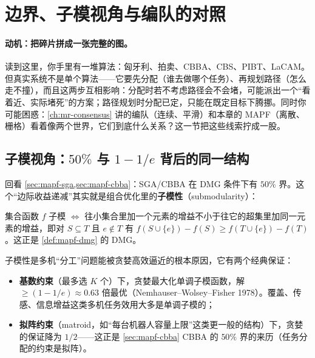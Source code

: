 \section{边界、子模视角与编队的对照}
\label{sec:mapf-submod}

\paragraph{动机：把碎片拼成一张完整的图。}
读到这里，你手里有一堆算法：匈牙利、拍卖、CBBA、CBS、PIBT、LaCAM。但真实系统不是单个算法——它要先分配（谁去做哪个任务）、再规划路径（怎么走不撞），而且这两步互相影响：分配时若不考虑路径会不会堵，可能派出一个“看着近、实际堵死”的方案；路径规划时分配已定，只能在既定目标下腾挪。同时你可能困惑：\cref{ch:mr-consensus} 讲的编队（连续、平滑）和本章的 MAPF（离散、栅格）看着像两个世界，它们到底什么关系？这一节把这些线索拧成一股。

\subsection{子模视角：\texorpdfstring{$50\%$}{50} 与 \texorpdfstring{$1-1/e$}{1-1/e} 背后的同一结构}
\label{sec:mapf-submod-theory}

回看 \cref{sec:mapf-sga,sec:mapf-cbba}：SGA/CBBA 在 DMG 条件下有 $50\%$ 界。这个“边际收益递减”其实就是组合优化里的\textbf{子模性}（submodularity）：

\begin{definition}[子模性]\label{def:mapf-submodular}
集合函数 $f$ 子模 $\iff$ 往小集合里加一个元素的增益不小于往它的超集里加同一元素的增益，即对 $S\subseteq T$ 且 $e\notin T$ 有 $f(S\cup\{e\})-f(S)\ge f(T\cup\{e\})-f(T)$。这正是 \cref{def:mapf-dmg} 的 DMG。
\end{definition}

子模性是多机“分工”问题能被贪婪高效逼近的根本原因，它有两个经典保证：

\begin{theorem}[子模贪婪的两个近似界]\label{thm:mapf-submod-bounds}
\begin{itemize}
  \item \textbf{基数约束}（最多选 $K$ 个）下，贪婪最大化单调子模函数，解 $\ge (1-1/e)\approx 0.63$ 倍最优（Nemhauser--Wolsey--Fisher 1978）\cite{nemhauser1978analysis}。覆盖、传感、信息增益这类多机任务效用大多是单调子模的；
  \item \textbf{拟阵约束}（matroid，如“每台机器人容量上限”这类更一般的结构）下，贪婪的保证降为 $1/2$——这正是 \cref{sec:mapf-cbba} CBBA 的 $50\%$ 界的来历（任务分配的约束是拟阵）。
\end{itemize}
\end{theorem}

